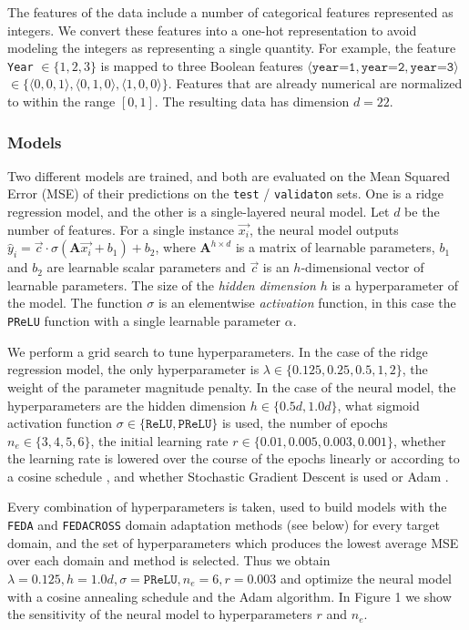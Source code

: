 \documentclass{article}
\begin{document}
The features of the data include a number of categorical features represented as integers. We convert these features into a one-hot representation to avoid modeling the integers as representing a single quantity. For example, the feature \texttt{Year} \(\in \{1, 2, 3\}\) is mapped to three Boolean features \(\langle \texttt{year=1}, \texttt{year=2}, \texttt{year=3}\rangle\) \( \in \{ \langle 0, 0, 1\rangle, \langle 0, 1, 0\rangle, \langle 1, 0, 0 \rangle \} \). Features that are already numerical are normalized to within the range \([0, 1]\). The resulting data has dimension \(d = 22\).

\subsubsection{Models}

Two different models are trained, and both are evaluated on the Mean Squared Error (MSE) of their predictions on the \texttt{test} / \texttt{validaton} sets. One is a ridge regression model, and the other is a single-layered neural model. Let \(d\) be the number of features. For a single instance \(\vec{x_i}\), the neural model outputs \(\hat{y}_i = \vec{c} \cdot \sigma(\mathbf{A}\vec{x_i} + b_1)  + b_2\), where \(\mathbf{A}^{h \times d}\) is a matrix of learnable parameters, \(b_1\) and \(b_2\) are learnable scalar parameters and \(\vec{c}\) is an \(h\)-dimensional vector of learnable parameters. The size of the \textit{hidden dimension} \(h\) is a hyperparameter of the model. The function \(\sigma\) is an elementwise \textit{activation} function, in this case the \texttt{PReLU} function \citep{prelu} with a single learnable parameter \(\alpha\). %

We perform a grid search to tune hyperparameters. In the case of the ridge regression model, the only hyperparameter is \(\lambda \in \{0.125, 0.25, 0.5, 1, 2\} \), the weight of the parameter magnitude penalty. In the case of the neural model, the hyperparameters are the hidden dimension \(h \in \{0.5d, 1.0d\} \), what sigmoid activation function \(\sigma \in \{\texttt{ReLU}, \texttt{PReLU}\} \) is used, the number of epochs \(n_e \in \{3, 4, 5, 6\}\), the initial learning rate \(r \in \{0.01, 0.005, 0.003, 0.001\}\), whether the learning rate is lowered over the course of the epochs linearly or according to a cosine schedule \citep{cosine}, and whether Stochastic Gradient Descent is used or Adam \citep{adam}. 

Every combination of hyperparameters is taken, used to build models with the \texttt{FEDA} and \texttt{FEDACROSS} domain adaptation methods (see below) for every target domain, and the set of hyperparameters which produces the lowest average MSE over each domain and method is selected. Thus we obtain \(\lambda = 0.125, h = 1.0d, \sigma = \texttt{PReLU}, n_e = 6, r = 0.003\) and optimize the neural model with a cosine annealing schedule and the Adam algorithm. In Figure 1 we show the sensitivity of the neural model to hyperparameters \(r\) and \(n_e\). %
\end{document}
